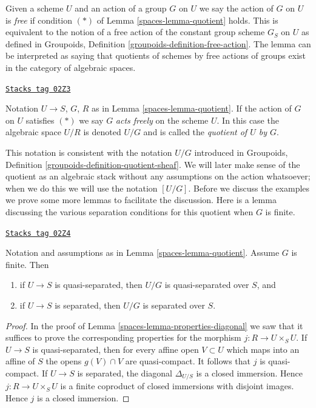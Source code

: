 Given a scheme $U$ and an action of a group $G$ on $U$ we say the action
of $G$ on $U$ is {\it free} if condition $(*)$ of Lemma \ref{spaces-lemma-quotient}
holds. This is equivalent to the notion of a free action of the constant
group scheme $G_S$ on $U$ as defined in
Groupoids, Definition \ref{groupoids-definition-free-action}.
The lemma can be interpreted as saying that quotients of schemes by
free actions of groups exist in the category of algebraic spaces.

\begin{definition}[Quotient]
\label{spaces-definition-quotient}
\href{https://stacks.math.columbia.edu/tag/02Z3}{\texttt{Stacks tag 02Z3}}

Notation $U \to S$, $G$, $R$ as in Lemma \ref{spaces-lemma-quotient}.
If the action of $G$ on $U$ satisfies $(*)$ we say $G$ {\it acts freely}
on the scheme $U$. In this case the algebraic space $U/R$ is denoted
$U/G$ and is called the {\it quotient of $U$ by $G$}.
\end{definition}

This notation is consistent with the notation $U/G$ introduced in
Groupoids, Definition \ref{groupoids-definition-quotient-sheaf}.
We will later make sense of the quotient as an algebraic stack without
any assumptions on the action whatsoever; when we do this we will use the
notation $[U/G]$. Before we discuss the examples we prove
some more lemmas to facilitate the discussion. Here is a lemma discussing the
various separation conditions for this quotient when $G$ is finite.

\begin{lemma}
\label{spaces-lemma-quotient-finite-separated}
\href{https://stacks.math.columbia.edu/tag/02Z4}{\texttt{Stacks tag 02Z4}}

Notation and assumptions as in Lemma \ref{spaces-lemma-quotient}.
Assume $G$ is finite. Then
\begin{enumerate}
\item if $U \to S$ is quasi-separated, then $U/G$ is quasi-separated
over $S$, and
\item if $U \to S$ is separated, then $U/G$ is separated over $S$.
\end{enumerate}
\end{lemma}

\begin{proof}

In the proof of Lemma \ref{spaces-lemma-properties-diagonal}
we saw that it suffices to prove the
corresponding properties for the morphism $j : R \to U \times_S U$.
If $U \to S$ is quasi-separated, then for every affine open $V \subset U$
which maps into an affine of $S$
the opens $g(V) \cap V$ are quasi-compact. It follows that $j$ is
quasi-compact.
If $U \to S$ is separated, the diagonal $\Delta_{U/S}$ is a closed
immersion. Hence $j : R \to U \times_S U$ is a finite coproduct
of closed immersions with disjoint images. Hence $j$ is a closed immersion.
\end{proof}

